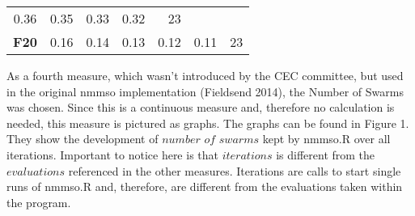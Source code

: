 \documentclass[12pt,a4paper]{article}
\begin{document}
\begin{longtable}[c]{@{}crrrrrr@{}}
\begin{minipage}[t]{0.08\columnwidth}
0.36
\strut\end{minipage} &
\begin{minipage}[t]{0.09\columnwidth}\raggedleft\strut
0.35
\strut\end{minipage} &
\begin{minipage}[t]{0.10\columnwidth}\raggedleft\strut
0.33
\strut\end{minipage} &
\begin{minipage}[t]{0.11\columnwidth}\raggedleft\strut
0.32
\strut\end{minipage} &
\begin{minipage}[t]{0.07\columnwidth}\raggedleft\strut
23
\strut\end{minipage}\tabularnewline
\begin{minipage}[t]{0.11\columnwidth}\centering\strut
\textbf{F20}
\strut\end{minipage} &
\begin{minipage}[t]{0.07\columnwidth}\raggedleft\strut
0.16
\strut\end{minipage} &
\begin{minipage}[t]{0.08\columnwidth}\raggedleft\strut
0.14
\strut\end{minipage} &
\begin{minipage}[t]{0.09\columnwidth}\raggedleft\strut
0.13
\strut\end{minipage} &
\begin{minipage}[t]{0.10\columnwidth}\raggedleft\strut
0.12
\strut\end{minipage} &
\begin{minipage}[t]{0.11\columnwidth}\raggedleft\strut
0.11
\strut\end{minipage} &
\begin{minipage}[t]{0.07\columnwidth}\raggedleft\strut
23
\strut\end{minipage}\tabularnewline
\bottomrule
\end{longtable}

As a fourth measure, which wasn't introduced by the CEC committee, but
used in the original nmmso implementation (Fieldsend 2014), the Number
of Swarms was chosen. Since this is a continuous measure and, therefore
no calculation is needed, this measure is pictured as graphs. The graphs
can be found in Figure 1. They show the development of \(number\) \(of\)
\(swarms\) kept by nmmso.R over all iterations. Important to notice here
is that \(iterations\) is different from the \(evaluations\) referenced
in the other measures. Iterations are calls to start single runs of
nmmso.R and, therefore, are different from the evaluations taken within
the program.
\end{document}
